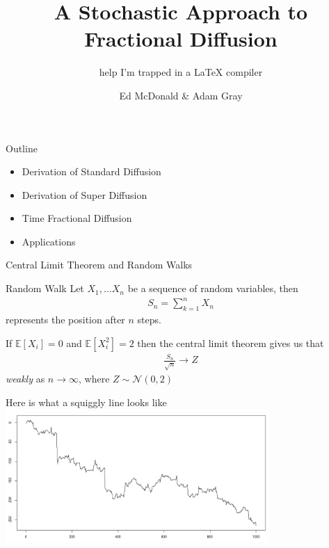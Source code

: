 \documentclass[pdf]{beamer}
\title{A Stochastic Approach to Fractional Diffusion}
\subtitle{help I'm trapped in a LaTeX compiler}
\author{Ed McDonald \& Adam Gray}
\institute{
	School of Mathematics and Statistics \\
	University of New South Wales
}
\newcommand{\lra}{\longrightarrow}
\begin{document}
\begin{frame}
	\titlepage
\end{frame}

\begin{frame}{Outline}
    \begin{itemize}
        \item Derivation of Standard Diffusion
        \item Derivation of Super Diffusion
        \item Time Fractional Diffusion
        \item Applications
    \end{itemize}
\end{frame}


\begin{frame}{Central Limit Theorem and Random Walks}
	\begin{block}{Random Walk}
	    Let $ X_1, \ldots X_n $ be a sequence of random variables,
	    then 
	    \begin{align}
	        S_n = \sum_{k=1}^n X_n 
	    \end{align}
	    represents the position after $ n $ steps.
	\end{block}
	If $ \mathbb{E}[X_i] = 0 $ and  $ \mathbb{E}[X_i^2] = 2 $ then the central limit theorem gives us that
	\begin{align}
	    \frac{S_n}{\sqrt{n}} \lra Z
	\end{align}
	\emph{weakly} as $ n \lra \infty $, where $ Z \sim \mathcal{N}(0,2) $
\end{frame}

\begin{frame}{Here is what a squiggly line looks like}
\includegraphics[width=100mm]{stableProcess.png}

\end{frame}
\end{document}
